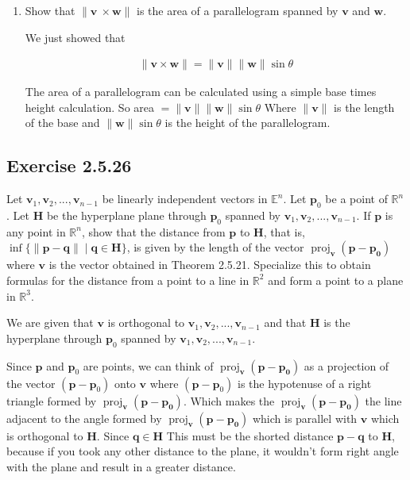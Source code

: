 \documentclass{tufte-book}
\DeclareMathOperator{\proj}{proj}
\newcommand{\vct}{\mathbf}
\theoremstyle{mytheoremstyle}
\theoremstyle{mylemstyle}
\theoremstyle{mydefstyle}
\begin{document}
\begin{enumerate}
\item Show that $\|\vct{v}\ \times \vct{w}\|$ is the area of a parallelogram spanned by $\vct{v}$ and $\vct{w}$.

We just showed that

\begin{align*}
\|\vct{v} \times \vct{w} \| = \|\vct{v}\|\|\vct{w}\|\sin\theta
\end{align*}

The area of a parallelogram can be calculated using a simple base times height calculation.  So area $=\|\vct{v}\|\|\vct{w}\|\sin \theta$  Where $\|\vct{v}\|$ is the length of the base and $\|\vct{w}\|\sin \theta$ is the height of the parallelogram.

\end{enumerate}

\subsection{Exercise 2.5.26}
Let $\mathbf{v}_1,\mathbf{v}_2,...,\mathbf{v}_{n-1}$ be linearly independent vectors in $\mathbb{E}^n$. Let $\mathbf{p}_0$ be a point of $\mathbb{R}^n$.  Let $\mathbf{H}$ be the hyperplane plane through $\mathbf{p}_0$ spanned by $\mathbf{v}_1,\mathbf{v}_2,...,\mathbf{v}_{n-1}$. If $\mathbf{p}$ is any point in $\mathbb{R}^n$, show that the distance from $\mathbf{p}$ to $\mathbf{H}$, that is, $\inf\{\|\mathbf{p}-\mathbf{q}\| \mid \mathbf{q} \in \mathbf{H} \}$, is given by the length of the vector $\proj_\vct{v}(\vct{p} - \vct{p_0})$ where $\vct{v}$ is the vector obtained in Theorem 2.5.21. Specialize this to obtain formulas for the distance from a point to a line in $\mathbb{R}^2$ and form a point to a plane in $\mathbb{R}^3$.


We are given that $\vct{v}$ is orthogonal to $\vct{v}_1,\vct{v}_2,...,\vct{v}_{n-1}$ and that $\mathbf{H}$ is the hyperplane through $\vct{p}_0$ spanned by $\vct{v}_1,\vct{v}_2,...,\vct{v}_{n-1}$.

Since $\vct{p}$ and $\vct{p}_0$ are points, we can think of $\proj_\vct{v}(\vct{p} - \vct{p_0})$ as a projection of the vector $(\vct{p} - \vct{p}_0)$ onto $\vct{v}$ where $(\vct{p} - \vct{p}_0)$ is the hypotenuse of a right triangle formed by $\proj_\vct{v}(\vct{p} - \vct{p_0})$. Which makes the $\proj_\vct{v}(\vct{p} - \vct{p_0})$ the line adjacent to the angle formed by $\proj_\vct{v}(\vct{p} - \vct{p_0})$  which is parallel with $\vct{v}$ which is orthogonal to $\mathbf{H}$.  Since $\vct{q} \in \mathbf{H}$  This must be the shorted distance  $\vct{p} -\vct{q}$ to $\mathbf{H}$, because if you took any other distance to the plane, it wouldn't form right angle with the plane and result in a greater distance.
\end{document}

